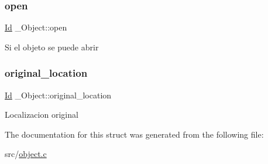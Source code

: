 \subsubsection{\texorpdfstring{open}{open}}
{\footnotesize\ttfamily \hyperlink{types_8h_a845e604fb28f7e3d97549da3448149d3}{Id} \+\_\+\+Object\+::open}

Si el objeto se puede abrir \mbox{\label{struct__Object_a70df2bf7a3fa2b9b20bd3a20afb2ac26}} 
\subsubsection{\texorpdfstring{original\+\_\+location}{original\_location}}
{\footnotesize\ttfamily \hyperlink{types_8h_a845e604fb28f7e3d97549da3448149d3}{Id} \+\_\+\+Object\+::original\+\_\+location}

Localizacion original 

The documentation for this struct was generated from the following file\+:\begin{DoxyCompactItemize}
\item 
src/\hyperlink{object_8c}{object.\+c}\end{DoxyCompactItemize}

